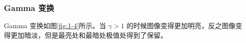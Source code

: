 \documentclass[a4paper]{article}
\begin{document}
\subsubsection{Gamma 变换}

Gamma 变换如图\ref{fig:1-4}所示。当 $\gamma > 1$ 的时候图像变得更加明亮，反之图像变得更加暗淡，但是最亮处和最暗处极值处得到了保留。

\begin{figure}[htp]
\centering
{}
\hfil
{}
\end{figure}
\end{document}
